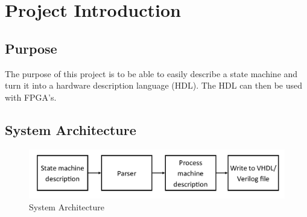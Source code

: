 \section{Project Introduction}
\subsection{Purpose}
The purpose of this project is to be able to easily describe a state machine
and turn it into a hardware description language (HDL). The HDL can then be
used with FPGA's.

\subsection{System Architecture}
\begin{figure}[h]
   \centering
   \includegraphics[scale=0.6]{SystemArchitecture}
   \caption{System Architecture}
   \label{fig:SysArchitecture}
\end{figure}

